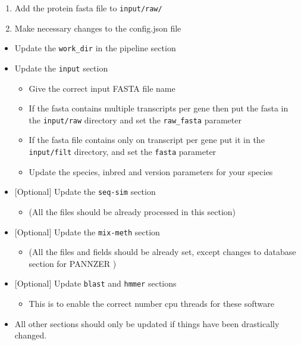 \begin{enumerate}
 \def\labelenumi{\arabic{enumi}.}

 \item
       Add the protein fasta file to \texttt{input/raw/}
 \item
       Make necessary changes to the config.json file
\end{enumerate}

\begin{itemize}

 \item
       Update the \texttt{work\_dir} in the pipeline section
 \item
       Update the \texttt{input} section

       \begin{itemize}

        \item
              Give the correct input FASTA file name
        \item
              If the fasta contains multiple transcripts per gene then put the
              fasta in the \texttt{input/raw} directory and set the
              \texttt{raw\_fasta} parameter
        \item
              If the fasta file contains only on transcript per gene put it in the
              \texttt{input/filt} directory, and set the \texttt{fasta} parameter
        \item
              Update the species, inbred and version parameters for your species
       \end{itemize}
 \item
       {[}Optional{]} Update the \texttt{seq-sim} section

       \begin{itemize}

        \item
              (All the files should be already processed in this section)
       \end{itemize}
 \item
       {[}Optional{]} Update the \texttt{mix-meth} section

       \begin{itemize}

        \item
              (All the files and fields should be already set, except changes to
              database section for PANNZER )
       \end{itemize}
 \item
       {[}Optional{]} Update \texttt{blast} and \texttt{hmmer} sections

       \begin{itemize}

        \item
              This is to enable the correct number cpu threads for these software
       \end{itemize}
 \item
       All other sections should only be updated if things have been
       drastically changed.
\end{itemize}

